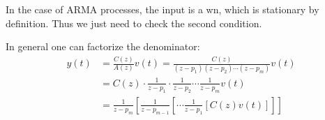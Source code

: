 In the case of ARMA processes, the input is a \gls{wn}, which is stationary by definition. Thus we just need to check the second condition.

In general one can factorize the denominator:
\begin{align*}
	y(t)&=\frac{C(z)}{A(z)}v(t)=\frac{C(z)}{(z-p_{1})(z-p_{2})\cdots(z-p_{m})}v(t)\\
	&=C(z)\cdot\frac{1}{z-p_{1}}\cdot\frac{1}{z-p_{2}}\cdots\frac{1}{z-p_{m}}v(t)\\
	&=\frac{1}{z-p_{m}}\left[ \frac{1}{z-p_{m-1}}\left[ \cdots\frac{1}{z-p_{1}}\left[ C(z)v(t) \right]   \right]   \right]  
\end{align*}
